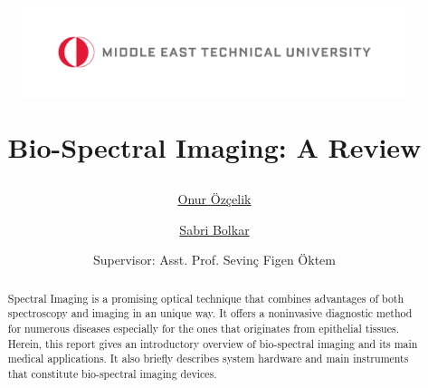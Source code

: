 \documentclass[a4paper]{article}
\begin{document}
        \title{
        \begin{figure}[!ht]
            \flushleft
                \includegraphics[width=1\textwidth]{metu_logo.jpg}
        \end{figure}
        \vspace{1cm}
        \Huge Bio-Spectral Imaging: A Review
        }

        \vspace{1cm}


        \author{\Large \href{mailto:first.student@smail.fh-koeln.de}{
        Onur {\"O}z{\c{c}}elik} \and \Large \href{mailto:second.student@smail.fh-koeln.de}{Sabri Bolkar} %
        \vspace{1cm}}

        \date{
        \vspace{0.8cm}
        \large Supervisor: Asst. 
        Prof. Sevin{\c{c}} Figen {\"O}ktem \\
        \vspace{1cm}
        \large %
        }

        \maketitle
        \setlength{\parindent}{0pt}

    \vspace{2cm}



    \begin{abstract}
	 Spectral Imaging is a promising optical technique that combines advantages of both spectroscopy and imaging in an unique way. It offers a noninvasive diagnostic method for numerous diseases especially for the ones that originates from epithelial tissues. Herein, this report gives an introductory overview of bio-spectral imaging and its main medical applications. It also briefly describes system hardware and main instruments that constitute bio-spectral imaging devices.  
    \end{abstract}
\end{document}

